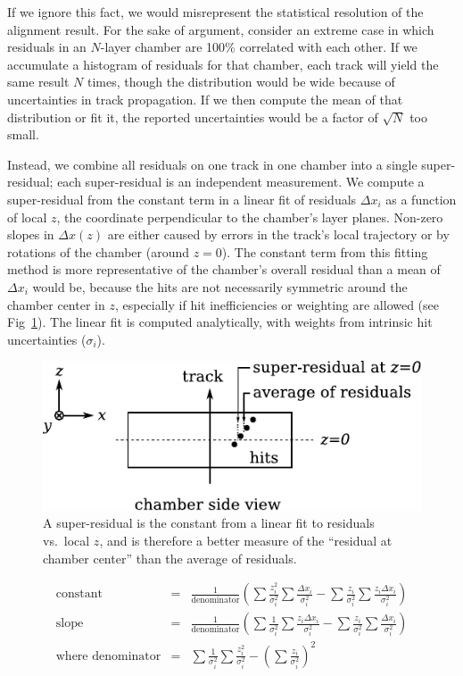 \documentclass[12pt]{article}
\begin{document}
If we ignore this fact, we would misrepresent the statistical
resolution of the alignment result.  For the sake of argument,
consider an extreme case in which residuals in an $N$-layer chamber
are 100\% correlated with each other.  If we accumulate a histogram of
residuals for that chamber, each track will yield the same result $N$
times, though the distribution would be wide because of uncertainties
in track propagation.  If we then compute the mean of that
distribution or fit it, the reported uncertainties would be a factor
of $\sqrt{N}$ too small.

Instead, we combine all residuals on one track in one chamber into a
single super-residual; each super-residual is an independent
measurement.  We compute a super-residual from the constant term in a
linear fit of residuals $\Delta x_i$ as a function of local $z$, the
coordinate perpendicular to the chamber's layer planes.  Non-zero
slopes in $\Delta x(z)$ are either caused by errors in the track's
local trajectory or by rotations of the chamber (around $z=0$).  The
constant term from this fitting method is more representative of the
chamber's overall residual than a mean of $\Delta x_i$ would be,
because the hits are not necessarily symmetric around the chamber
center in $z$, especially if hit inefficiencies or weighting are
allowed (see Fig~\ref{fig:superresidual0}).  The linear fit is
computed analytically, with weights from intrinsic hit uncertainties
($\sigma_i$).

\begin{figure}
\begin{center} \includegraphics{superresidual0.pdf} \end{center}
\caption{A super-residual is the constant from a linear fit to residuals vs.\ local $z$, and is therefore a better measure of the ``residual at chamber center'' than the average of residuals. \label{fig:superresidual0}}
\end{figure}

\begin{eqnarray}
\mbox{constant} &=& \frac{1}{\mbox{denominator}} \left(\sum\frac{z_i^2}{\sigma_i^2} \sum\frac{\Delta x_i}{\sigma_i^2} - \sum\frac{z_i}{\sigma_i^2} \sum\frac{z_i \Delta x_i}{\sigma_i^2}\right) \\
\mbox{slope} &=& \frac{1}{\mbox{denominator}} \left(\sum\frac{1}{\sigma_i^2} \sum\frac{z_i \Delta x_i}{\sigma_i^2} - \sum\frac{z_i}{\sigma_i^2} \sum\frac{\Delta x_i}{\sigma_i^2}\right) \\
\mbox{where denominator} &=& \sum\frac{1}{\sigma_i^2} \sum\frac{z_i^2}{\sigma_i^2} - \left(\sum\frac{z_i}{\sigma_i^2}\right)^2
\end{eqnarray}
\end{document}
